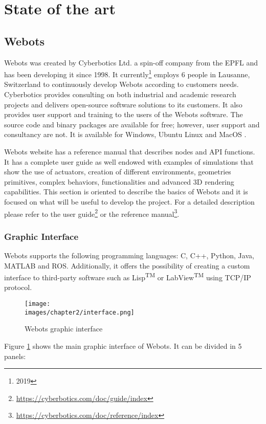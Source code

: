 \section{State of the art}
\subsection{Webots}
Webots was created by Cyberbotics Ltd. a spin-off company from the EPFL and has been developing it since 1998. It currently\footnote{2019} employs 6 people in Lausanne, Switzerland to continuously develop Webots according to customers needs. Cyberbotics provides consulting on both industrial and academic research projects and delivers open-source software solutions to its customers. It also provides user support and training to the users of the Webots software. The source code and binary packages are available for free; however, user support and consultancy are not. It is available for Windows, Ubuntu Linux and MacOS \cite{cyberbotics}.

Webots website has a reference manual that describes nodes and API functions. It has a complete user guide as well endowed with examples of simulations that show the use of actuators, creation of different environments, geometries primitives, complex behaviors, functionalities and advanced 3D rendering capabilities. This section is oriented to describe the basics of Webots and it is focused on what will be useful to develop the project. For a detailed description please refer to the user guide\footnote{\url{https://cyberbotics.com/doc/guide/index}} or the reference manual\footnote{\url{https://cyberbotics.com/doc/reference/index}}.

\subsubsection{Graphic Interface}
Webots supports the following programming languages: C, C++, Python, Java, MATLAB and ROS. Additionally, it offers the possibility of creating a custom interface to third-party software such as Lisp\textsuperscript{TM} or LabView\textsuperscript{TM} using TCP/IP protocol.

\begin{figure}[h]
	\texttt{[image: \\images/chapter2/interface.png]}
	\caption{Webots graphic interface}
	\label{fig-ch-2:interface}
\end{figure}

Figure \ref{fig-ch-2:interface} shows the main graphic interface of Webots. It can be divided in 5 panels:

